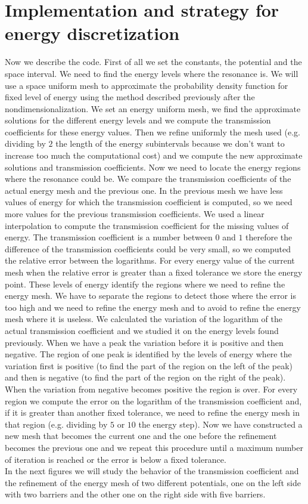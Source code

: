 \documentclass[12pt,a4paper,onecolumn]{article}
\theoremstyle{definition}
\theoremstyle{plain}
\begin{document}
\section{Implementation and strategy for energy discretization}
Now we describe the code. First of all we set the constants, the potential and the space interval. We need to find the energy levels where the resonance is. We will use a space uniform mesh to approximate the probability density function for fixed level of energy using the method described previously after the nondimensionalization. We set an energy uniform mesh, we find the approximate solutions for the different energy  levels and we compute the transmission coefficients for these energy values. Then we refine uniformly the mesh used (e.g. dividing by $2$ the length of the energy subintervals because we don't want to increase too much the computational cost) and we compute the new approximate solutions and transmission coefficients.  Now we need to locate the energy regions where the resonance could be. We compare the transmission coefficients of the actual energy mesh and the previous one. In the previous mesh we have less values of energy for which the transmission coefficient is computed, so we need more values for the previous transmission coefficients. We used a linear interpolation to compute the transmission coefficient for the missing values of energy. The transmission coefficient is a number between $0$ and $1$ therefore the difference of the transmission coefficients could be very small, so we computed the relative error between the logarithms. For every energy value of the current mesh when the relative error is greater than a fixed tolerance we store the energy point. These levels of energy identify the regions where we need to refine the energy mesh. We have to separate the regions to detect those where the error is too high and we need to refine the energy mesh and to avoid to refine the energy mesh where it is useless. We calculated the variation of the logarithm of the actual transmission coefficient and we studied it on the energy levels found previously. When we have a peak the variation before it is positive and then negative. The region of one peak is identified by the levels of energy where the variation first is positive (to find the part of the region on the left of the peak) and then is negative (to find the part of the region on the right of the peak). When the variation from negative becomes positive the region is over. For every region we compute the error on the logarithm of the transmission coefficient and, if it is greater than another fixed tolerance, we need to refine the energy mesh in that region (e.g. dividing by $5$ or $10$ the energy step). Now we have constructed a new mesh that becomes the current one and the one before the refinement becomes the previous one and we repeat this procedure until a maximum number of iteration is reached or the error is below a fixed tolerance.\\
In the next figures we will study the behavior of the transmission coefficient and the refinement of the energy mesh of two different potentials, one on the left side with two barriers and the other one on the right side with five barriers.
\end{document}
